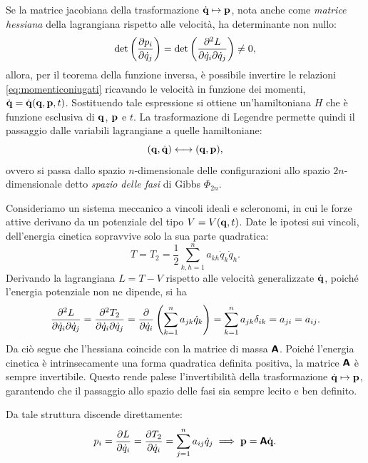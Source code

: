 Se la matrice jacobiana della trasformazione $\dot{\vb{q}} \mapsto \vb{p}$, nota anche come \emph{matrice hessiana} della lagrangiana rispetto alle velocità, ha determinante non nullo:
\begin{equation*}
    \det\left(\pdv{p_i}{\dot{q}_j}\right) = \det\left(\pdv[2]{L}{\dot{q}_i}{\dot{q}_j}\right) \neq 0,
\end{equation*}
allora, per il teorema della funzione inversa, è possibile invertire le relazioni \eqref{eq:momenticoniugati} ricavando le velocità in funzione dei momenti, $\dot{\vb{q}} = \dot{\vb{q}}(\vb{q}, \vb{p}, t)$. Sostituendo tale espressione si ottiene un'hamiltoniana $H$ che è funzione esclusiva di $\vb{q}$, $\vb{p}$ e $t$.
La trasformazione di Legendre permette quindi il passaggio dalle variabili lagrangiane a quelle hamiltoniane:
\begin{equation*}
    (\vb{q}, \dot{\vb{q}}) \longleftrightarrow (\vb{q}, \vb{p}),
\end{equation*}
ovvero si passa dallo spazio $n$-dimensionale delle configurazioni allo spazio $2n$-dimensionale detto \emph{spazio delle fasi} di Gibbs $\Phi_{2n}$. 

\begin{remark} \label{rem:matrice_hessiana}
    Consideriamo un sistema meccanico a vincoli ideali e scleronomi, in cui le forze attive derivano da un potenziale del tipo ${V=V(\vb{q}, t)}$. Date le ipotesi sui vincoli, dell'energia cinetica sopravvive solo la sua parte quadratica:
    \begin{equation}\label{eq:T_2_quadratica}
        T = T_2 = \frac{1}{2}\sum_{k,h=1}^n a_{kh} \dot{q}_k \dot{q}_h.
    \end{equation}
    Derivando la lagrangiana $L = T - V$ rispetto alle velocità generalizzate $\dot{\vb{q}}$, poiché l'energia potenziale non ne dipende, si ha
    \begin{equation*}
        \pdv[2]{L}{\dot{q}_i}{\dot{q}_j} = \pdv[2]{T_2}{\dot{q}_i}{\dot{q}_j} = \pdv{}{\dot{q}_i} \left( \sum_{k=1}^n a_{jk} \dot{q}_k \right) = \sum_{k=1}^n a_{jk} \delta_{ik} = a_{ji} = a_{ij}.
    \end{equation*}
    Da ciò segue che l'hessiana coincide con la matrice di massa $\boldsymbol{\mathsf{A}}$. Poiché l'energia cinetica è intrinsecamente una forma quadratica definita positiva, la matrice $\boldsymbol{\mathsf{A}}$ è sempre invertibile. Questo rende palese l'invertibilità della trasformazione $\dot{\vb{q}} \mapsto \vb{p}$, garantendo che il passaggio allo spazio delle fasi sia sempre lecito e ben definito.
    
    Da tale struttura discende direttamente:
    \begin{equation}\label{eq:p_i_lineari}
        p_i = \pdv{L}{\dot{q}_i} = \pdv{T_2}{\dot{q}_i} = \sum_{j=1}^n a_{ij} \dot{q}_j \implies \vb{p} = \boldsymbol{\mathsf{A}} \dot{\vb{q}}.
    \end{equation}
\end{remark}

